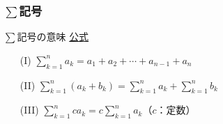 \documentclass[dvipdfmx,aspectratio=169]{beamer}
\begin{document}
	\subsubsection{$ \sum $記号}
	\begin{frame}{$ \sum $記号の意味}
		\underline{公式}
		\begin{enumerate}
			\item[(I)]  $ \displaystyle\sum_{k=1}^n a_k = a_1 + a_2 + \cdots + a_{n-1} + a_n $
			\item[(II)] $ \displaystyle\sum_{k=1}^n (a_k + b_k) = \sum_{k=1}^n a_k + \sum_{k=1}^n b_k $
			\item[(III)] $ \displaystyle\sum_{k=1}^n ca_k = c\sum_{k=1}^n a_k $（$ c $：定数）
		\end{enumerate}
	\end{frame}
\end{document}
